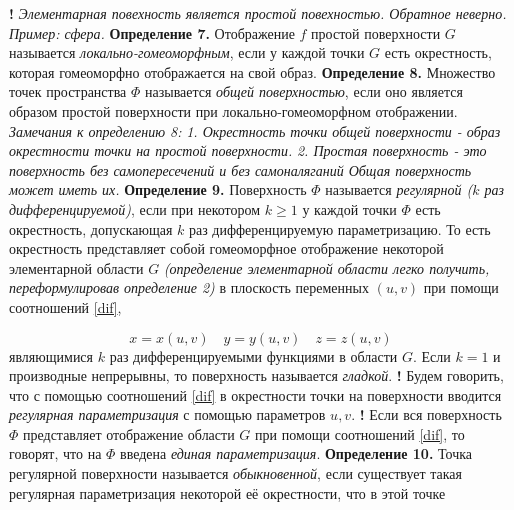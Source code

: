 \documentclass[12pt,a4paper]{article}
\begin{document}
	\textbf{!} \textit{Элементарная повехность является простой повехностью. Обратное неверно. Пример: сфера.}
	\newline
	\newline
	\textbf{Определение 7.} Отображение $f$ простой поверхности $G$ называется \textit{локально-гомеоморфным}, если у каждой точки $G$ есть окрестность, которая гомеоморфно отображается на свой образ.
	\newline
	\newline
	\textbf{Определение 8.} Множество точек пространства $\Phi$ называется \textit{общей поверхностью}, если оно является образом простой поверхности при локально-гомеоморфном отображении.
	\newline
	\newline
	\textit{Замечания к определению 8:}
	\newline
	\textit{1. Окрестность точки общей поверхности - образ окрестности точки на простой поверхности.}
	\newline
	\textit{2. Простая поверхность - это поверхность без самопересечений и без самоналяганий Общая поверхность может иметь их.}
	\newline
	\newline
	\textbf{Определение 9.} Поверхность $\Phi$ называется \textit{регулярной ($k$ раз дифференцируемой)}, если при некотором $k \geq 1$ у каждой точки $\Phi$ есть окрестность, допускающая $k$ раз дифференцируемую параметризацию.
	\newline
	\newline
	То есть окрестность представляет собой гомеоморфное отображение некоторой элементарной области $G$ \textit{(определение элементарной области легко получить, переформулировав определение 2)} в плоскость переменных $(u,v)$ при помощи соотношений \eqref{dif},
	
	\begin{equation}\label{dif}
		x = x(u,v)\quad y = y(u,v)\quad z = z(u,v)
	\end{equation}
	являющимися $k$ раз дифференцируемыми функциями в области $G$.
	Если $k = 1$ и производные непрерывны, то поверхность называется \textit{гладкой}.
	\newline
	\newline
	\textbf{!} Будем говорить, что с помощью соотношений \eqref{dif} в окрестности точки на поверхности вводится \textit{регулярная параметризация} с помощью параметров $u,v$.
	\newline
	\textbf{!} Если вся поверхность $\Phi$ представляет отображение области $G$  при помощи соотношений \eqref{dif}, то говорят, что на $\Phi$ введена \textit{единая параметризация}.
	\newline
	\newline
	\textbf{Определение 10.} Точка регулярной поверхности называется \textit{обыкновенной}, если существует такая регулярная параметризация некоторой её окрестности, что в этой точке
	
\end{document}
